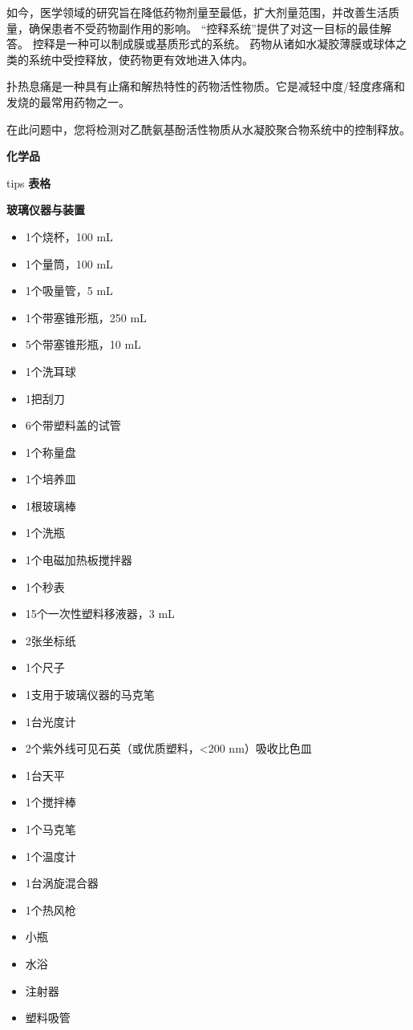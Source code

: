 如今，医学领域的研究旨在降低药物剂量至最低，扩大剂量范围，并改善生活质量，确保患者不受药物副作用的影响。
``控释系统''提供了对这一目标的最佳解答。
控释是一种可以制成膜或基质形式的系统。
药物从诸如水凝胶薄膜或球体之类的系统中受控释放，使药物更有效地进入体内。

扑热息痛是一种具有止痛和解热特性的药物活性物质。它是减轻中度/轻度疼痛和发烧的最常用药物之一。

在此问题中，您将检测对乙酰氨基酚活性物质从水凝胶聚合物系统中的控制释放。

\noindent\textbf{化学品}

tips \textbf{表格}

\noindent\textbf{玻璃仪器与装置}

\begin{itemize}
\tightlist
\item
  1个烧杯，100 mL
\item
  1个量筒，100 mL
\item
  1个吸量管，5 mL
\item
  1个带塞锥形瓶，250 mL
\item
  5个带塞锥形瓶，10 mL
\item
  1个洗耳球
\item
  1把刮刀
\item
  6个带塑料盖的试管
\item
  1个称量盘
\item
  1个培养皿
\item
  1根玻璃棒
\item
  1个洗瓶
\item
  1个电磁加热板搅拌器
\item
  1个秒表
\item
  15个一次性塑料移液器，3 mL
\item
  2张坐标纸
\item
  1个尺子
\item
  1支用于玻璃仪器的马克笔
\item
  1台光度计
\item
  2个紫外线可见石英（或优质塑料，\textless{}200 nm）吸收比色皿
\item
  1台天平
\item
  1个搅拌棒
\item
  1个马克笔
\item
  1个温度计
\item
  1台涡旋混合器
\item
  1个热风枪
\item
  小瓶
\item
  水浴
\item
  注射器
\item
  塑料吸管
\end{itemize}

